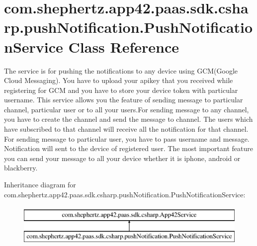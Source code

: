 \hypertarget{classcom_1_1shephertz_1_1app42_1_1paas_1_1sdk_1_1csharp_1_1push_notification_1_1_push_notification_service}{\section{com.\+shephertz.\+app42.\+paas.\+sdk.\+csharp.\+push\+Notification.\+Push\+Notification\+Service Class Reference}
\label{classcom_1_1shephertz_1_1app42_1_1paas_1_1sdk_1_1csharp_1_1push_notification_1_1_push_notification_service}
}


The service is for pushing the notifications to any device using G\+C\+M(\+Google Cloud Messaging). You have to upload your apikey that you received while registering for G\+C\+M and you have to store your device token with particular username. This service allows you the feature of sending message to particular channel, particular user or to all your users.\+For sending message to any channel, you have to create the channel and send the message to channel. The users which have subscribed to that channel will receive all the notification for that channel. For sending message to particular user, you have to pass username and message. Notification will sent to the device of registered user. The most important feature you can send your message to all your device whether it is iphone, android or blackberry.  


Inheritance diagram for com.\+shephertz.\+app42.\+paas.\+sdk.\+csharp.\+push\+Notification.\+Push\+Notification\+Service\+:\begin{figure}[H]
\begin{center}
\leavevmode
\includegraphics[height=2.000000cm]{classcom_1_1shephertz_1_1app42_1_1paas_1_1sdk_1_1csharp_1_1push_notification_1_1_push_notification_service}
\end{center}
\end{figure}
